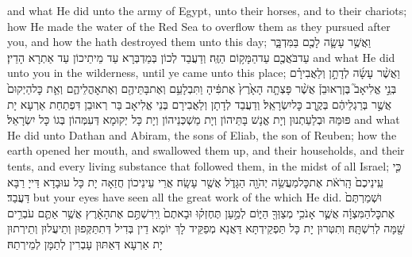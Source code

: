 {and what He did unto the army of Egypt, unto their horses, and to their chariots; how He made the water of the Red Sea to overflow them as they pursued after you, and how the \lord\space hath destroyed them unto this day;}{}
{וַאֲשֶׁ֥ר עָשָׂ֛ה לָכֶ֖ם בַּמִּדְבָּ֑ר עַד\maqqaf בֹּאֲכֶ֖ם עַד\maqqaf הַמָּק֥וֹם הַזֶּֽה׃}
{וְדַעֲבַד לְכוֹן בְּמַדְבְּרָא עַד מֵיתֵיכוֹן עַד אַתְרָא הָדֵין׃}
{and what He did unto you in the wilderness, until ye came unto this place;}{}
{וַאֲשֶׁ֨ר עָשָׂ֜ה לְדָתָ֣ן וְלַאֲבִירָ֗ם בְּנֵ֣י אֱלִיאָב֮ בֶּן\maqqaf רְאוּבֵן֒ אֲשֶׁ֨ר פָּצְתָ֤ה הָאָ֙רֶץ֙ אֶת\maqqaf פִּ֔יהָ וַתִּבְלָעֵ֥ם וְאֶת\maqqaf בָּתֵּיהֶ֖ם וְאֶת\maqqaf אׇהֳלֵיהֶ֑ם וְאֵ֤ת כׇּל\maqqaf הַיְקוּם֙ אֲשֶׁ֣ר בְּרַגְלֵיהֶ֔ם בְּקֶ֖רֶב כׇּל\maqqaf יִשְׂרָאֵֽל׃}
{וְדַעֲבַד לְדָתָן וְלַאֲבִירָם בְּנֵי אֱלִיאָב בַּר רְאוּבֵן דִּפְתַחַת אַרְעָא יָת פּוּמַּהּ וּבְלַעַתְנוּן וְיָת אֱנָשׁ בָּתֵּיהוֹן וְיָת מַשְׁכְּנֵיהוֹן וְיָת כָּל יְקוּמָא דְּעִמְּהוֹן בְּגוֹ כָּל יִשְׂרָאֵל׃}
{and what He did unto Dathan and Abiram, the sons of Eliab, the son of Reuben; how the earth opened her mouth, and swallowed them up, and their households, and their tents, and every living substance that followed them, in the midst of all Israel;}{}
{כִּ֤י עֵֽינֵיכֶם֙ הָֽרֹאֹ֔ת אֶת\maqqaf כׇּל\maqqaf מַעֲשֵׂ֥ה יְהֹוָ֖ה הַגָּדֹ֑ל אֲשֶׁ֖ר עָשָֽׂה׃}
{אֲרֵי עֵינֵיכוֹן חֲזַאָה יָת כָּל עוּבָדָא דַּייָ רַבָּא דַּעֲבַד׃}
{but your eyes have seen all the great work of the \lord\space which He did.}{}
{וּשְׁמַרְתֶּם֙ אֶת\maqqaf כׇּל\maqqaf הַמִּצְוָ֔ה אֲשֶׁ֛ר אָנֹכִ֥י מְצַוְּךָ֖ הַיּ֑וֹם לְמַ֣עַן תֶּחֶזְק֗וּ וּבָאתֶם֙ וִֽירִשְׁתֶּ֣ם אֶת\maqqaf הָאָ֔רֶץ אֲשֶׁ֥ר אַתֶּ֛ם עֹבְרִ֥ים שָׁ֖מָּה לְרִשְׁתָּֽהּ׃}
{וְתִטְּרוּן יָת כָּל תַּפְקֵידְתָּא דַּאֲנָא מְפַקֵּיד לָךְ יוֹמָא דֵין בְּדִיל דְּתִתַּקְּפוּן וְתֵיעֲלוּן וְתֵירְתוּן יָת אַרְעָא דְּאַתּוּן עָבְרִין לְתַמָּן לְמֵירְתַהּ׃}

